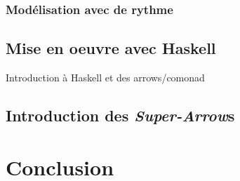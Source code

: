 \documentclass{llncs}
\newcommand{\SAs}{\emph{Super-Arrow}s }
\begin{document}
\subsubsection{Modélisation avec de rythme}
\subsection{Mise en oeuvre avec Haskell}
Introduction à Haskell et des arrows/comonad
\subsection{Introduction des \SAs}

\section{Conclusion}





\end{document}

